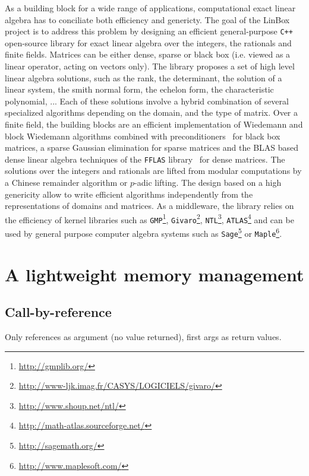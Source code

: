 \documentclass[runningheads,a4paper]{llncs}
\newcommand{\linboxsp}{{\sc LinBox}\xspace}
\begin{document}
As a building block for a wide range of applications, computational exact linear
algebra has to conciliate both efficiency and genericty. The goal of the 
\linboxsp project is to address this problem by designing an efficient general-purpose
\texttt{C++} open-source library for exact linear algebra over the integers, the
rationals and finite fields. 
Matrices can be either dense, sparse or black box (i.e. viewed as a linear
operator, acting on vectors only). The library proposes a set of high level
linear algebra solutions, such as the rank, the determinant, the solution of a
linear system, the smith normal form, the echelon form, the characteristic
polynomial, ... Each of these solutions involve a hybrid combination of several specialized
algorithms depending on the domain, and the type of matrix. Over a finite field,
the building blocks are an efficient implementation of Wiedemann and block
Wiedemann algorithms combined with preconditioners~\cite{CEKSTV:2002:EP} for
black box matrices, a sparse Gaussian elimination for sparse matrices and the
BLAS based dense linear algebra techniques of the \texttt{FFLAS}
library~\cite{DGP:2008:dlaff} for dense matrices. The solutions over the integers
and rationals are lifted from modular computations by a Chinese remainder
algorithm or $p$-adic lifting.
The design based on a high genericity allow to write efficient algorithms  independently from the
representations of domains and matrices. As a middleware, the library relies on the
efficiency of kernel libraries such as  \texttt{GMP}\footnote{\url{http://gmplib.org/}},
\texttt{Givaro}\footnote{\url{http://www-ljk.imag.fr/CASYS/LOGICIELS/givaro/}},
\texttt{NTL}\footnote{\url{http://www.shoup.net/ntl/}},
\texttt{ATLAS}\footnote{\url{http://math-atlas.sourceforge.net/}} and can be used by general
purpose computer algebra systems such as \texttt{Sage}\footnote{\url{http://sagemath.org/}} or \texttt{Maple}\footnote{\url{http://www.maplesoft.com/}}. 

\section{A lightweight memory management}

\subsection{Call-by-reference}

Only references as argument (no value returned), first args as return
values.
\end{document}
